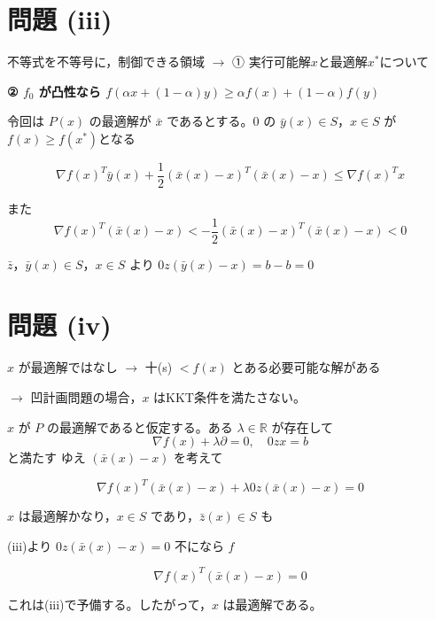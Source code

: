\documentclass[12pt,a4paper]{article}
\begin{document}
\section*{問題 (iii)}

不等式を不等号に，制御できる領域 $\rightarrow$ ① 実行可能解$x$と最適解$x^*$について

\textbf{② $f_0$ が凸性なら $f(\alpha x + (1-\alpha)y) \geq \alpha f(x) + (1-\alpha)f(y)$}

令回は $P(x)$ の最適解が $\bar{x}$ であるとする。0 の 
$\bar{y}(x) \in S$，$x \in S$ が $f(x) \geq f(x^*)$となる

\[\nabla f(x)^T \bar{y}(x) + \frac{1}{2}(\bar{x}(x) - x)^T(\bar{x}(x) - x) \leq \nabla f(x)^T x\]

また 
\[\nabla f(x)^T(\bar{x}(x) - x) < -\frac{1}{2}(\bar{x}(x) - x)^T(\bar{x}(x) - x) < 0\]

$\bar{z}$，$\bar{y}(x) \in S$，$x \in S$ より $0z(\bar{y}(x) - x) = b - b = 0$

\section*{問題 (iv)}

$x$ が最適解ではなし $\rightarrow$ 十(s) $< f(x)$ とある必要可能な解がある

$\rightarrow$ 凹計画問題の場合，$x$ はKKT条件を満たさない。

$x$ が $P$ の最適解であると仮定する。ある $\lambda \in \mathbb{R}$ が存在して
\[\nabla f(x) + \lambda \partial = 0, \quad 0z x = b\]
と満たす ゆえ $(\bar{x}(x) - x)$ を考えて

\[\nabla f(x)^T(\bar{x}(x) - x) + \lambda 0z (\bar{x}(x) - x) = 0\]

$x$ は最適解かなり，$x \in S$ であり，$\bar{z}(x) \in S$ も

(iii)より $0z(\bar{x}(x) - x) = 0$ 不になら $f$

\[\nabla f(x)^T(\bar{x}(x) - x) = 0\]

これは(iii)で予備する。したがって，$x$ は最適解である。
\end{document}
